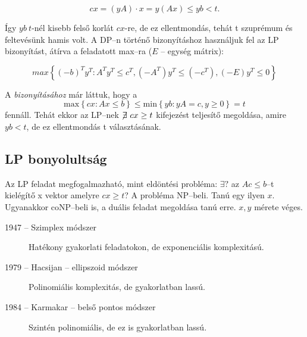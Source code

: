 \[ cx = (yA)\cdot x = y (Ax) \leq yb < t.\]

Így $yb~t$-nél kisebb felső korlát $cx$-re, de ez ellentmondás, tehát t szuprémum és
feltevésünk hamis volt. A DP--n történő bizonyításhoz használjuk fel az LP bizonyítást, 
átírva a feladatott max--ra ($E$ -- egység mátrix):

\[ max \left\{ (-b)^T y^T : A^T y^T \leq c^T, (-A^T) y^T \leq (-c^T),
(-E)y^T \leq 0 \right\} \]
 
A  \emph{bizonyításához} már láttuk, hogy a \[ \mbox{max}\left\{
cx:Ax \leq b \right\} \leq
   \mbox{min}\left\{ yb:yA = c, y \geq 0 \right\}=t
\] fennáll. Tehát ekkor az LP--nek $\not\!\exists~cx \geq t$ kifejezést teljesítő
megoldása, amire $yb<t$, de ez ellentmondás t választásának.

\subsection{LP bonyolultság}

Az LP feladat megfogalmazható, mint eldöntési probléma: $\exists?$ az $Ac \leq
b$--t kielégítő x vektor amelyre $cx\geq t$? A probléma NP--beli. Tanú egy ilyen
$x$. Ugyanakkor coNP--beli is, a duális feladat megoldása tanú erre. $x, y$
mérete véges.

\begin{description}
  \item[1947 -- Szimplex módszer] Hatékony gyakorlati feladatokon, de exponenciális komplexitású.
  \item[1979 --  Hacsijan -- ellipszoid módszer] Polinomiális komplexitás, de gyakorlatban lassú.
  \item[1984 --  Karmakar -- belső pontos módszer] Szintén polinomiális, de ez is gyakorlatban lassú.
\end{description}